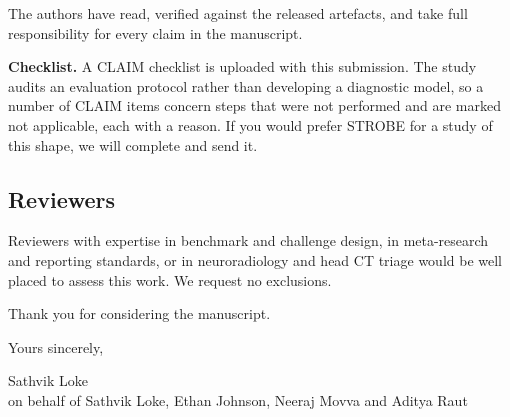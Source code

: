\documentclass[11pt,letterpaper]{article}
\begin{document}
The authors have read, verified against the released artefacts, and take full
responsibility for every claim in the manuscript.

\textbf{Checklist.} A CLAIM checklist is uploaded with this submission. The study
audits an evaluation protocol rather than developing a diagnostic model, so a
number of CLAIM items concern steps that were not performed and are marked not
applicable, each with a reason. If you would prefer STROBE for a study of this
shape, we will complete and send it.

\subsection*{Reviewers}

Reviewers with expertise in benchmark and challenge design, in meta-research and
reporting standards, or in neuroradiology and head CT triage would be well placed
to assess this work. We request no exclusions.

Thank you for considering the manuscript.

\vspace{1.0em}
\noindent Yours sincerely,

\vspace{2.0em}
\noindent
Sathvik Loke\\
on behalf of Sathvik Loke, Ethan Johnson, Neeraj Movva and Aditya Raut
\end{document}
